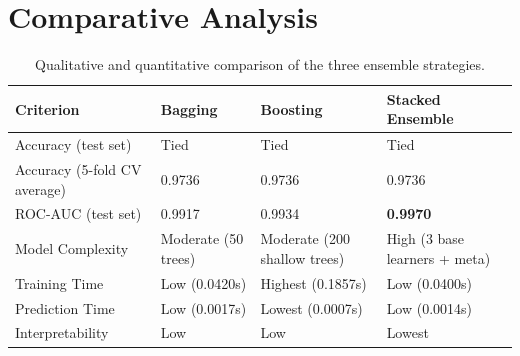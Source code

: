 \documentclass[11pt,a4paper]{article}
\begin{document}
\section{Comparative Analysis}
\begin{table}[h]
\centering
\begin{tabular}{@{}p{2.9cm}p{3.1cm}p{3.4cm}p{3.4cm}@{}}
\toprule
Criterion & Bagging & Boosting & Stacked Ensemble \\
\midrule
Accuracy (test set) & Tied & Tied & Tied \\
Accuracy (5-fold CV average) & 0.9736 & 0.9736 & 0.9736 \\
ROC-AUC (test set) & 0.9917 & 0.9934 & \textbf{0.9970} \\
Model Complexity & Moderate (50 trees) & Moderate (200 shallow trees) & High (3 base learners + meta) \\
Training Time & Low (0.0420s) & Highest (0.1857s) & Low (0.0400s) \\
Prediction Time & Low (0.0017s) & Lowest (0.0007s) & Low (0.0014s) \\
Interpretability & Low & Low & Lowest \\
\bottomrule
\end{tabular}
\caption{Qualitative and quantitative comparison of the three ensemble strategies.}
\end{table}
\end{document}
